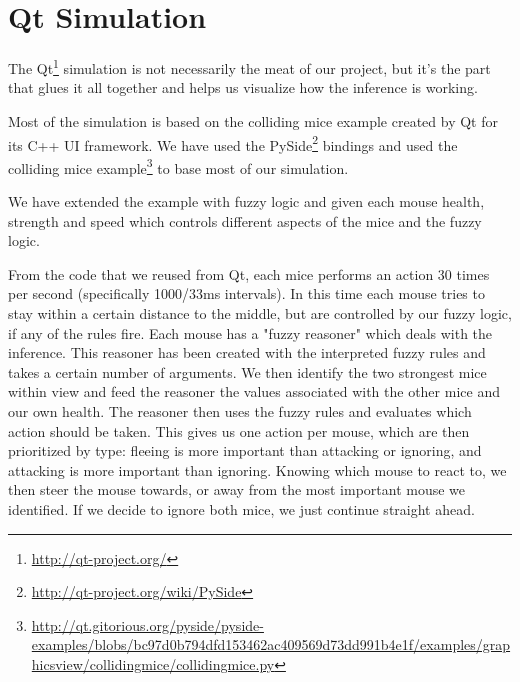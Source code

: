 \section{Qt Simulation}\label{qt simulation}
The Qt\footnote{\url{http://qt-project.org/}} simulation is not necessarily the
meat of our project, but it's the part that glues it all together and helps us
visualize how the inference is working.

Most of the simulation is based on the colliding mice example created by Qt
for its C++ UI framework. We have used the PySide\footnote{\url{http://qt-project.org/wiki/PySide}}
bindings and used the colliding mice example\footnote{\url{http://qt.gitorious.org/pyside/pyside-examples/blobs/bc97d0b794dfd153462ac409569d73dd991b4e1f/examples/graphicsview/collidingmice/collidingmice.py}}
to base most of our simulation.

We have extended the example with fuzzy logic and given each mouse health, strength and speed
which controls different aspects of the mice and the fuzzy logic.

From the code that we reused from Qt, each mice performs an action 30 times per
second (specifically 1000/33ms intervals). In this time each mouse tries to stay within
a certain distance to the middle, but are controlled by our fuzzy logic, if any of the rules fire.
Each mouse has a "fuzzy reasoner" which deals with the inference. This reasoner has been created
with the interpreted fuzzy rules and takes a certain number of arguments. We then
identify the two strongest mice within view and feed the reasoner the values associated
with the other mice and our own health. The reasoner then uses the fuzzy rules and
evaluates which action should be taken. This gives us one action per mouse, 
which are then prioritized by type: fleeing is more important than attacking or ignoring, 
and attacking is more important than ignoring. Knowing which mouse to react to, we
then steer the mouse towards, or away from the most important mouse we identified.
If we decide to ignore both mice, we just continue straight ahead.
